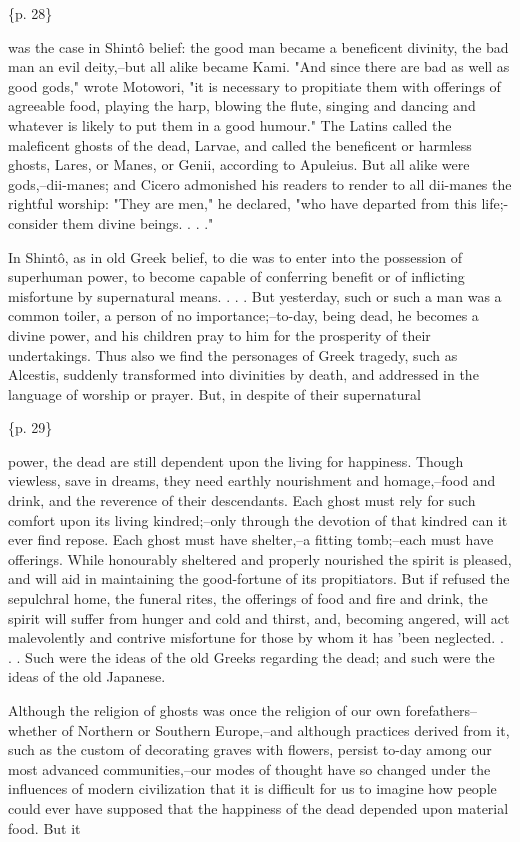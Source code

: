 \{p. 28\}

was the case in Shintô belief: the good man became a beneficent divinity, the bad man an evil deity,--but all alike became Kami. "And since there are bad as well as good gods," wrote Motowori, "it is necessary to propitiate them with offerings of agreeable food, playing the harp, blowing the flute, singing and dancing and whatever is likely to put them in a good humour." The Latins called the maleficent ghosts of the dead, Larvae, and called the beneficent or harmless ghosts, Lares, or Manes, or Genii, according to Apuleius. But all alike were gods,--dii-manes; and Cicero admonished his readers to render to all dii-manes the rightful worship: "They are men," he declared, "who have departed from this life;-consider them divine beings. . . ."

In Shintô, as in old Greek belief, to die was to enter into the possession of superhuman power, to become capable of conferring benefit or of inflicting misfortune by supernatural means. . . . But yesterday, such or such a man was a common toiler, a person of no importance;--to-day, being dead, he becomes a divine power, and his children pray to him for the prosperity of their undertakings. Thus also we find the personages of Greek tragedy, such as Alcestis, suddenly transformed into divinities by death, and addressed in the language of worship or prayer. But, in despite of their supernatural

\{p. 29\}

power, the dead are still dependent upon the living for happiness. Though viewless, save in dreams, they need earthly nourishment and homage,--food and drink, and the reverence of their descendants. Each ghost must rely for such comfort upon its living kindred;--only through the devotion of that kindred can it ever find repose. Each ghost must have shelter,--a fitting tomb;--each must have offerings. While honourably sheltered and properly nourished the spirit is pleased, and will aid in maintaining the good-fortune of its propitiators. But if refused the sepulchral home, the funeral rites, the offerings of food and fire and drink, the spirit will suffer from hunger and cold and thirst, and, becoming angered, will act malevolently and contrive misfortune for those by whom it has 'been neglected. . . . Such were the ideas of the old Greeks regarding the dead; and such were the ideas of the old Japanese.



Although the religion of ghosts was once the religion of our own forefathers--whether of Northern or Southern Europe,--and although practices derived from it, such as the custom of decorating graves with flowers, persist to-day among our most advanced communities,--our modes of thought have so changed under the influences of modern civilization that it is difficult for us to imagine how people could ever have supposed that the happiness of the dead depended upon material food. But it

